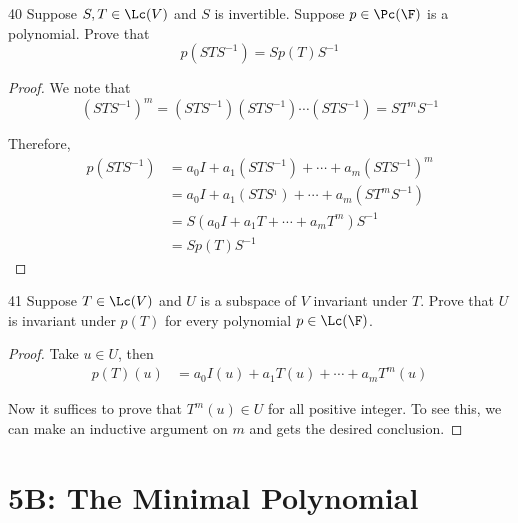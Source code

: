 \documentclass{extarticle}
\begin{document}
\begin{problem}{40}
    Suppose \(S, T \in \Lc(V)\) and \(S\) is invertible. Suppose \(p \in \Pc(\F)\) is a polynomial. Prove that 
    \[p(STS^{-1}) = S p(T)S^{-1}\]
\end{problem}

\begin{proof}
We note that 
\[(STS^{-1})^m = (STS^{-1})(STS^{-1}) \cdots (STS^{-1}) = ST^m S^{-1}\]

Therefore, 
\begin{align*}
    p(STS^{-1})
    &= a_0I + a_1(STS^{-1}) + \cdots + a_m(STS^{-1})^m \\ 
    &= a_0I + a_1(STS^{_1}) + \cdots + a_m(ST^mS^{-1}) \\ 
    &= S(a_0 I + a_1 T + \cdots + a_m T^m)S^{-1} \\ 
    &= Sp(T)S^{-1}
\end{align*}
\end{proof}

\begin{problem}{41}
    Suppose \(T \in \Lc(V)\) and \(U\) is a subspace of \(V\) invariant under \(T\). Prove that \(U\) is invariant 
    under \(p(T)\) for every polynomial \(p \in \Lc(\F)\).
\end{problem}

\begin{proof}
Take \(u \in U\), then 
\begin{align*}
    p(T)(u) 
    &= a_0I(u) + a_1T(u) + \cdots + a_m T^m(u)
\end{align*}

Now it suffices to prove that \(T^m(u) \in U\) for all positive integer. To see this, we can make an inductive 
argument on \(m\) and gets the desired conclusion.
\end{proof}




\newpage 
\section*{5B: The Minimal Polynomial}
\end{document}
